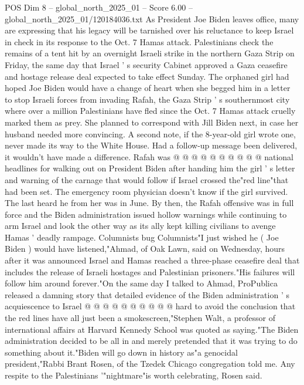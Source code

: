 \begin{textsample}{POS Dim 8 – global\_north\_2025\_01 – Score 6.00 – global\_north\_2025\_01/120184036.txt}  \label{ex:f8_pos_296}
As President Joe Biden leaves office, many are expressing that his legacy will be tarnished over his reluctance to keep Israel in check in its response to the Oct. 7 Hamas attack.
Palestinians check the remains of a tent hit by an overnight Israeli strike in the northern Gaza Strip on Friday, the same day that Israel ' s security Cabinet approved a Gaza ceasefire and hostage release deal expected to take effect Sunday.
The orphaned girl had hoped Joe Biden would have a change of heart when she begged him in a letter to stop Israeli forces from invading Rafah, the Gaza Strip ' s southernmost city where over a million Palestinians have fled since the Oct. 7 Hamas attack cruelly marked them as prey.
She planned to correspond with Jill Biden next, in case her husband needed more convincing.
A second note, if the 8-year-old girl wrote one, never made its way to the White House.
Had a follow-up message been delivered, it wouldn't have made a difference.
Rafah was @ @ @ @ @ @ @ @ @ @ national headlines for walking out on President Biden after handing him the girl ' s letter and warning of the carnage that would follow if Israel crossed the"red line"that had been set.
The emergency room physician doesn't know if the girl survived.
The last heard he from her was in June.
By then, the Rafah offensive was in full force and the Biden administration issued hollow warnings while continuing to arm Israel and look the other way as its ally kept killing civilians to avenge Hamas ' deadly rampage.
Columnists bug Columnists"I just wished he ( Joe Biden ) would have listened,"Ahmad, of Oak Lawn, said on Wednesday, hours after it was announced Israel and Hamas reached a three-phase ceasefire deal that includes the release of Israeli hostages and Palestinian prisoners."His failures will follow him around forever."On the same day I talked to Ahmad, ProPublica released a damning story that detailed evidence of the Biden administration ' s acquiescence to Israel @ @ @ @ @ @ @ @ @ @ hard to avoid the conclusion that the red lines have all just been a smokescreen,"Stephen Walt, a professor of international affairs at Harvard Kennedy School was quoted as saying."The Biden administration decided to be all in and merely pretended that it was trying to do something about it."Biden will go down in history as"a genocidal president,"Rabbi Brant Rosen, of the Tzedek Chicago congregation told me.
Any respite to the Palestinians '"nightmare"is worth celebrating, Rosen said.

\end{textsample}
